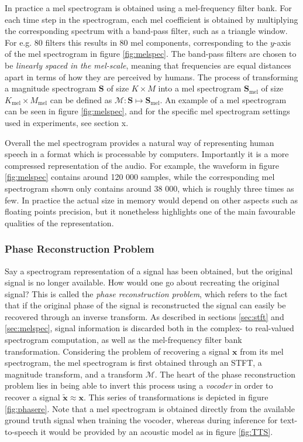 \documentclass{article}
\begin{document}
In practice a mel spectrogram is obtained using a mel-frequency filter bank. For each time step in the spectrogram, each mel coefficient is obtained by multiplying the corresponding spectrum with a band-pass filter, such as a triangle window. For e.g. 80 filters this results in 80 mel components, corresponding to the $y$-axis of the mel spectrogram in figure \ref{fig:melspec}. The band-pass filters are chosen to be \textit{linearly spaced in the mel-scale}, meaning that frequencies are equal distances apart in terms of how they are perceived by humans. The process of transforming a magnitude spectrogram $\bm{S}$ of size $K \times M$ into a mel spectrogram $\bm{S}_{\text{mel}}$ of size $K_{\text{mel}} \times M_{\text{mel}}$ can be defined as $\mathcal{M}: \bm{S} \mapsto \bm{S}_{\text{mel}}$. An example of a mel spectrogram can be seen in figure \ref{fig:melspec}, and for the specific mel spectrogram settings used in experiments, see section x.

Overall the mel spectrogram provides a natural way of representing human speech in a format which is processable by computers. Importantly it is a more compressed representation of the audio. For example, the waveform in figure \ref{fig:melspec} contains around 120 000 samples, while the corresponding mel spectrogram shown only contains around 38 000, which is roughly three times as few. In practice the actual size in memory would depend on other aspects such as floating points precision, but it nonetheless highlights one of the main favourable qualities of the representation.

\subsubsection{Phase Reconstruction Problem} \label{sec:phaseprob}

Say a spectrogram representation of a signal has been obtained, but the original signal is no longer available. How would one go about recreating the original signal? This is called the \textit{phase reconstruction problem}, which refers to the fact that if the original phase of the signal is reconstructed the signal can easily be recovered through an inverse transform. As described in sections \ref{sec:stft} and \ref{sec:melspec}, signal information is discarded both in the complex- to real-valued spectrogram computation, as well as the mel-frequency filter bank transformation. Considering the problem of recovering a signal $\bm{x}$ from its mel spectrogram, the mel spectrogram is first obtained through an STFT, a magnitude transform, and a transform $\mathcal{M}$. The heart of the phase reconstruction problem lies in being able to invert this process using a \textit{vocoder} in order to recover a signal $\tilde{\bm{x}} \approx \bm{x}$. This series of transformations is depicted in figure \ref{fig:phasere}. Note that a mel spectrogram is obtained directly from the available ground truth signal when training the vocoder, whereas during inference for text-to-speech it would be provided by an acoustic model as in figure \ref{fig:TTS}.
\end{document}
